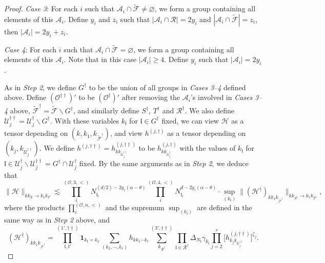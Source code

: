 \documentclass[11 pt,reqno]{amsart}
\theoremstyle{definition}
\theoremstyle{remark}
\numberwithin{equation}{section}
\newcommand{\Fc}{\mathcal{F}}
\newcommand{\Rc}{\mathcal{R}}
\newcommand{\Uc}{\mathcal{U}}
\newcommand{\Ac}{\mathcal{A}}
\newcommand{\Hc}{\mathcal{H}}
\newcommand{\lf}{\mathfrak{l}}
\newcommand{\Os}{\mathscr{O}}
\begin{document}
{\begin{proof}
\emph{Case 3}:
 For each $i$ such that $\Ac_i\cap\widetilde{\Fc}\neq\varnothing$, we form a group containing all elements of this $\Ac_i$. Define $y_i$ and $z_i$ such that $|\Ac_i\cap\Rc|=2y_i$ and $|\Ac_i\cap\widetilde{\Fc}|=z_i$, then $|\Ac_i|=2y_i+z_i$.

\emph{Case 4}: 
For each $i$ such that $\Ac_i\cap\widetilde{\Fc}=\varnothing$, we form a group containing all elements of this $\Ac_i$. Note that in this case $|\Ac_i|\geq 4$. Define $y_i$ such that $|\Ac_i|=2y_i$.

As in \emph{Step 2}, we define $G^\dagger$ to be the union of all groups in \emph{Cases 3--4} defined above. Define $(\Os^{\dagger\dagger})'$ to be $(\Os^{\dagger})'$ after removing the $\Ac_i$'s involved in \emph{Cases 3--4} above, $\widetilde{\Fc}^\dagger=\widetilde{\Fc}\backslash G^\dagger$, and similarly define $S^\dagger$, $T^\dagger$ and $\Rc^\dagger$. We also define $\Uc_j^{\dagger\dagger}=\Uc_j^\dagger\backslash G^\dagger$. With these variables $k_\lf$ for $\lf\in G^\dagger$ fixed, we can view $\Hc$ as a tensor depending on $(k,k_1,k_{\widetilde{\Fc}^\dagger})$, and view $h^{(j,\dagger)}$ as a tensor depending on $(k_j,k_{\Uc_j^{\dagger\dagger}})$. We define $h^{(j,\dagger\dagger)}=h_{kk_{\Uc_j^{\dagger\dagger}}}^{(j,\dagger\dagger)}$ to be $h_{kk_{\Uc_j^{\dagger}}}^{(j,\dagger)}$ with the values of $k_\lf$ for $\lf\in\Uc_j^\dagger\backslash \Uc_j^{\dagger\dagger}=G^\dagger\cap \Uc_j^\dagger$ fixed. By the same arguments as in \emph{Step 2}, we deduce that
\begin{equation}\label{reducedest3}\|\Hc\|_{kk_S\to k_1k_T}\lesssim\prod_i^{(\Os,3,<)}N_{\lf_i}^{(d/2)-2y_i(\alpha-\theta)}\prod_i^{(\Os,4,<)}N_{\lf_i}^{d-2y_i(\alpha-\theta)}\cdot\sup_{(k_\lf)}\|(\Hc^\dagger)_{kk_1k_{\widetilde{\Fc}^\dagger}}\|_{kk_{S^\dagger}\to k_1k_{T^\dagger}},
\end{equation} where the products $\prod_i^{(\Os,n,<)}$ and the supremum $\sup_{(k_\lf)}$ are defined in the same way as in \emph{Step 2} above, and
\begin{equation}\label{reducedmerge4}(\Hc^\dagger)_{kk_1k_{\widetilde{\Fc}^\dagger}}=\prod_{\lf,\lf'}^{(1',\dagger\dagger)}\mathbf{1}_{k_\lf=k_{\lf'}}\sum_{(k_2,\cdots,k_r)}h_{kk_1\cdots k_r}\sum_{k_{\Rc^\dagger}}^{(3',\dagger\dagger)}\prod_{\lf\in\Rc^\dagger}\Delta_{N_\lf}\gamma_{k_\lf}\prod_{j=2}^{r}\big[h_{k_jk_{\Uc_j^{\dagger\dagger}}}^{(j,\dagger\dagger)}\big]^{\zeta_j}.

\end{equation}
\end{proof}}
\end{document}
